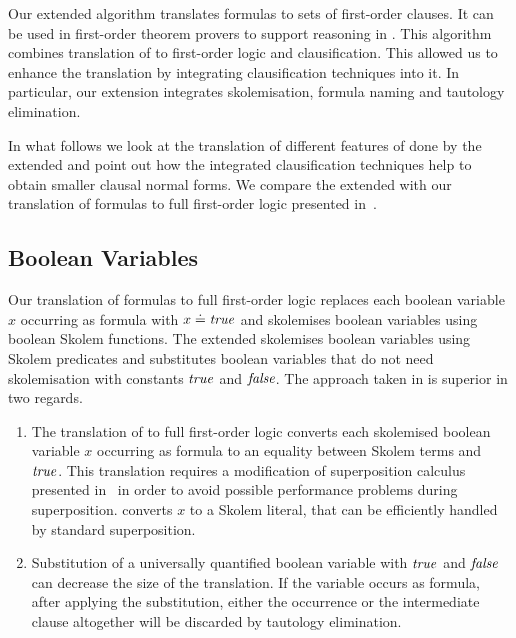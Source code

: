 Our extended \newcnf{} algorithm translates \folb{} formulas to sets of first-order clauses. It can be used in first-order theorem provers to support reasoning in \folb{}. This algorithm combines translation of \folb{} to first-order logic and clausification. This allowed us to enhance the translation by integrating clausification techniques into it. In particular, our extension integrates skolemisation, formula naming and tautology elimination. 

In what follows we look at the translation of different features of \folb{} done by the extended \newcnf{} and point out how the integrated clausification techniques help to obtain smaller clausal normal forms. We compare the extended \newcnf{} with our translation of \folb{} formulas to full first-order logic presented in~\cite{FOOL}.


\subsection{Boolean Variables}
Our translation of \folb{} formulas to full first-order logic replaces each boolean variable $x$ occurring as formula with $x \doteq \mathit{true}$ and skolemises boolean variables using boolean Skolem functions. The extended \newcnf{} skolemises boolean variables using Skolem predicates and substitutes boolean variables that do not need skolemisation with constants $\mathit{true}$ and $\mathit{false}$. The approach taken in \newcnf{} is superior in two regards.
\begin{enumerate}
  \item The translation of \folb{} to full first-order logic converts each skolemised boolean variable $x$ occurring as formula to an equality between Skolem terms and $\mathit{true}$. This translation requires a modification of superposition calculus presented in~\cite{FOOL} in order to avoid possible performance problems during superposition. \newcnf{} converts $x$ to a Skolem literal, that can be efficiently handled by standard superposition.  
  \item Substitution of a universally quantified boolean variable with $\mathit{true}$ and $\mathit{false}$ can decrease the size of the translation. If the variable occurs as formula, after applying the substitution, either the occurrence or the intermediate clause altogether will be discarded by tautology elimination.
\end{enumerate}

